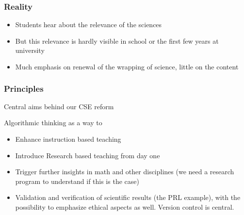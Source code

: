 \documentclass{beamer}
\begin{document}
\begin{frame}
\frametitle{Reality}

\begin{block}{}

\begin{itemize}
\item Students hear about the relevance of the sciences

\item But this relevance is hardly visible in school or the first few years at university

\item Much emphasis on renewal of the wrapping of science, little on the content
\end{itemize}

\noindent
\end{block}
\end{frame}

\begin{frame}
\frametitle{Principles}

\begin{block}{Central aims behind our CSE reform }

Algorithmic  thinking as a way to

\begin{itemize}
\item Enhance instruction based teaching

\item Introduce Research based teaching  from day one

\item Trigger further insights in math and other disciplines (we need a research program to understand if this is the case)

\item Validation and verification of scientific results (the PRL example), with the possibility to emphasize ethical aspects as well. Version control is central.
\end{itemize}

\noindent
\end{block}
\end{frame}
\end{document}
